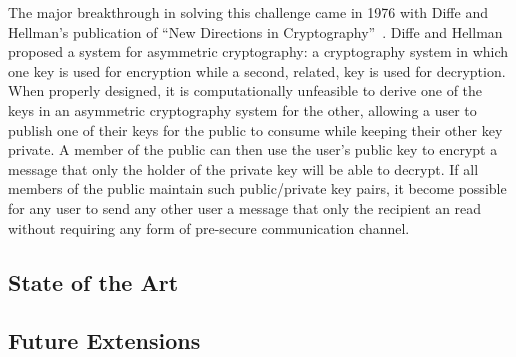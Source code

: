 \documentclass{sig-alternate}
\begin{document}
The major breakthrough in solving this challenge came in 1976 with
Diffe and Hellman's publication of ``New Directions in
Cryptography''~\cite{Diffie1976}. Diffe and Hellman proposed a system
for asymmetric cryptography: a cryptography system in which one key is
used for encryption while a second, related, key is used for
decryption. When properly designed, it is computationally unfeasible
to derive one of the keys in an asymmetric cryptography system for the
other, allowing a user to publish one of their keys for the public to
consume while keeping their other key private. A member of the public
can then use the user's public key to encrypt a message that only the
holder of the private key will be able to decrypt. If all members of
the public maintain such public/private key pairs, it become possible
for any user to send any other user a message that only the recipient
an read without requiring any form of pre-secure communication
channel.

\subsection{State of the Art}



\subsection{Future Extensions}
\end{document}

